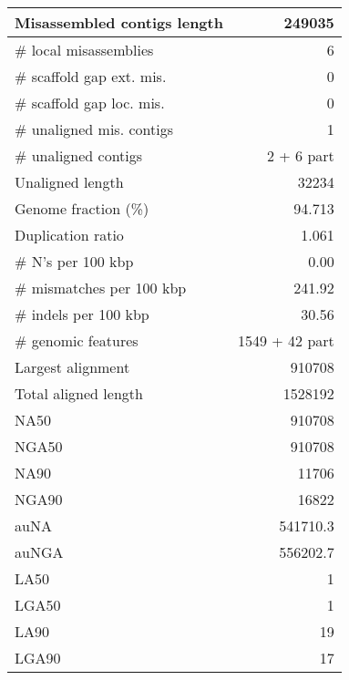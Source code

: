 \documentclass[12pt,a4paper]{article}
\begin{document}
\begin{table}[ht]
\begin{center}
\begin{tabular}{|l*{1}{|r}|}
Misassembled contigs length & 249035 \\ \hline
\# local misassemblies & 6 \\ \hline
\# scaffold gap ext. mis. & 0 \\ \hline
\# scaffold gap loc. mis. & 0 \\ \hline
\# unaligned mis. contigs & 1 \\ \hline
\# unaligned contigs & 2 + 6 part \\ \hline
Unaligned length & 32234 \\ \hline
Genome fraction (\%) & 94.713 \\ \hline
Duplication ratio & 1.061 \\ \hline
\# N's per 100 kbp & 0.00 \\ \hline
\# mismatches per 100 kbp & 241.92 \\ \hline
\# indels per 100 kbp & 30.56 \\ \hline
\# genomic features & 1549 + 42 part \\ \hline
Largest alignment & 910708 \\ \hline
Total aligned length & 1528192 \\ \hline
NA50 & 910708 \\ \hline
NGA50 & 910708 \\ \hline
NA90 & 11706 \\ \hline
NGA90 & 16822 \\ \hline
auNA & 541710.3 \\ \hline
auNGA & 556202.7 \\ \hline
LA50 & 1 \\ \hline
LGA50 & 1 \\ \hline
LA90 & 19 \\ \hline
LGA90 & 17 \\ \hline
\end{tabular}
\end{center}
\end{table}
\end{document}
